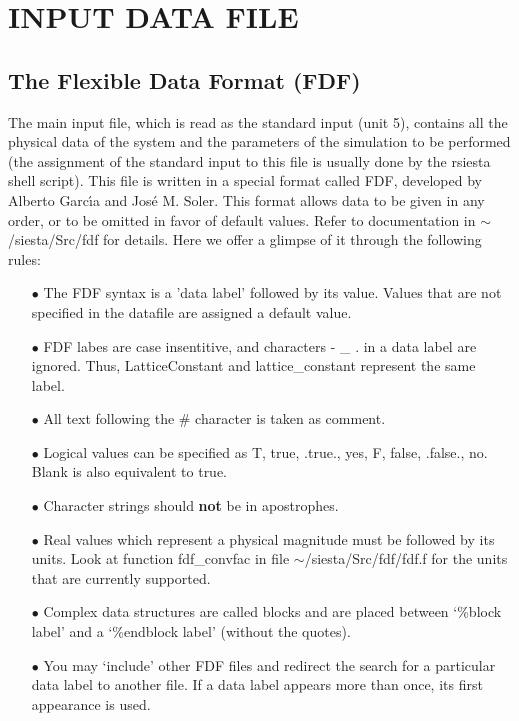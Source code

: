 \section{INPUT DATA FILE}

\subsection{The Flexible Data Format (FDF)}

The main input file,
which is read as the standard input (unit 5),
contains all the physical data of the system and the parameters of 
the simulation to be performed (the assignment of the standard
input to this file is usually done by the rsiesta shell script).
This file is written in a special format called FDF, developed by 
Alberto Garc\'{\i}a and Jos\'e M. Soler. This format allows data to be 
given in any order, or to be omitted in favor of default values.
Refer to documentation in $\sim$/siesta/Src/fdf for details.
Here we offer a glimpse of it through the following rules:

\begin{itemize}

\item[$\bullet$] The FDF syntax is a 'data label' followed by its value.
Values that are not specified in the datafile are assigned
a default value. 

\item[$\bullet$] FDF labes are case insentitive, and characters - \_ . 
in a data label are ignored. Thus, LatticeConstant and
lattice\_constant represent the same label.

\item[$\bullet$] All text following the \# character is taken as comment.

\item[$\bullet$] Logical values can be specified as T, true, .true.,
yes, F, false, .false., no. Blank is also equivalent to true.

\item[$\bullet$] Character strings should {\bf not} be in apostrophes.

\item[$\bullet$] Real values which represent a physical magnitude must be
followed by its units. Look at function fdf\_convfac in
file $\sim$/siesta/Src/fdf/fdf.f for the units that are currently supported.

\item[$\bullet$] Complex data structures are called blocks and are
placed between `\%block label' and a `\%endblock label' 
(without the quotes).

\item[$\bullet$] You may `include' other FDF files and redirect the search
for a particular data label to another file. 
If a data label appears more than once, its first appearance
is used.

\end{itemize}

